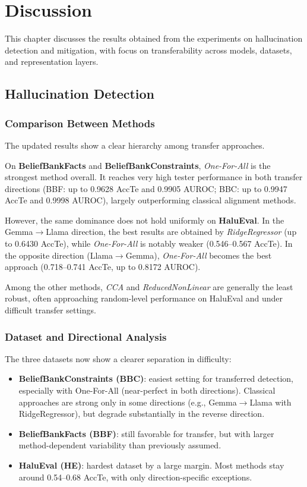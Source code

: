 \chapter{Discussion}

This chapter discusses the results obtained from the experiments on hallucination detection and mitigation, with focus on transferability across models, datasets, and representation layers.

\section{Hallucination Detection}

\subsection{Comparison Between Methods}
The updated results show a clear hierarchy among transfer approaches.

On \textbf{BeliefBankFacts} and \textbf{BeliefBankConstraints}, \textit{One-For-All} is the strongest method overall. It reaches very high tester performance in both transfer directions (BBF: up to 0.9628 AccTe and 0.9905 AUROC; BBC: up to 0.9947 AccTe and 0.9998 AUROC), largely outperforming classical alignment methods.

However, the same dominance does not hold uniformly on \textbf{HaluEval}. In the Gemma$\rightarrow$Llama direction, the best results are obtained by \textit{RidgeRegressor} (up to 0.6430 AccTe), while \textit{One-For-All} is notably weaker (0.546--0.567 AccTe). In the opposite direction (Llama$\rightarrow$Gemma), \textit{One-For-All} becomes the best approach (0.718--0.741 AccTe, up to 0.8172 AUROC). 

Among the other methods, \textit{CCA} and \textit{ReducedNonLinear} are generally the least robust, often approaching random-level performance on HaluEval and under difficult transfer settings.

\subsection{Dataset and Directional Analysis}
The three datasets now show a clearer separation in difficulty:

\begin{itemize}
    \item \textbf{BeliefBankConstraints (BBC)}: easiest setting for transferred detection, especially with One-For-All (near-perfect in both directions). Classical approaches are strong only in some directions (e.g., Gemma$\rightarrow$Llama with RidgeRegressor), but degrade substantially in the reverse direction.
    \item \textbf{BeliefBankFacts (BBF)}: still favorable for transfer, but with larger method-dependent variability than previously assumed.
    \item \textbf{HaluEval (HE)}: hardest dataset by a large margin. Most methods stay around 0.54--0.68 AccTe, with only direction-specific exceptions.
\end{itemize}

